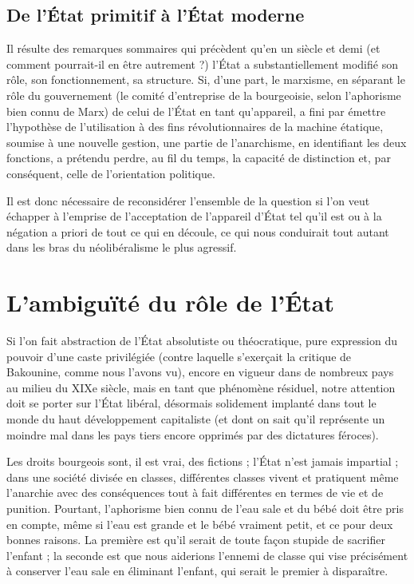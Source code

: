 \section{De l'État primitif à l'État moderne}

Il résulte des remarques sommaires qui précèdent qu'en un siècle et demi (et comment pourrait-il en être autrement ?) l'État a substantiellement modifié son rôle, son fonctionnement, sa structure. Si, d'une part, le marxisme, en séparant le rôle du gouvernement (le comité d'entreprise de la bourgeoisie, selon l'aphorisme bien connu de Marx) de celui de l'État en tant qu'appareil, a fini par émettre l'hypothèse de l'utilisation à des fins révolutionnaires de la machine étatique, soumise à une nouvelle gestion, une partie de l'anarchisme, en identifiant les deux fonctions, a prétendu perdre, au fil du temps, la capacité de distinction et, par conséquent, celle de l'orientation politique.

Il est donc nécessaire de reconsidérer l'ensemble de la question si l'on veut échapper à l'emprise de l'acceptation de l'appareil d'État tel qu'il est ou à la négation a priori de tout ce qui en découle, ce qui nous conduirait tout autant dans les bras du néolibéralisme le plus agressif.

\chapter{L'ambiguïté du rôle de l'État}

Si l'on fait abstraction de l'État absolutiste ou théocratique, pure expression du pouvoir d'une caste privilégiée (contre laquelle s'exerçait la critique de Bakounine, comme nous l'avons vu), encore en vigueur dans de nombreux pays au milieu du XIXe siècle, mais en tant que phénomène résiduel, notre attention doit se porter sur l'État libéral, désormais solidement implanté dans tout le monde du haut développement capitaliste (et dont on sait qu'il représente un moindre mal dans les pays tiers encore opprimés par des dictatures féroces).

Les droits bourgeois sont, il est vrai, des fictions ; l'État n'est jamais impartial ; dans une société divisée en classes, différentes classes vivent et pratiquent même l'anarchie avec des conséquences tout à fait différentes en termes de vie et de punition. Pourtant, l'aphorisme bien connu de l'eau sale et du bébé doit être pris en compte, même si l'eau est grande et le bébé vraiment petit, et ce pour deux bonnes raisons. La première est qu'il serait de toute façon stupide de sacrifier l'enfant ; la seconde est que nous aiderions l'ennemi de classe qui vise précisément à conserver l'eau sale en éliminant l'enfant, qui serait le premier à disparaître.

